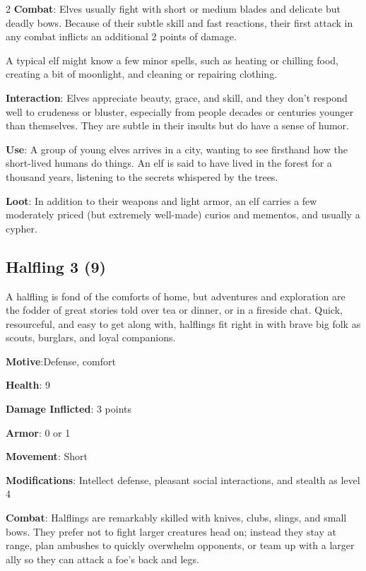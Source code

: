 \begin{multicols}{2}
\textbf{Combat}: Elves usually fight with short or medium blades and delicate but deadly bows. Because of their subtle skill and fast reactions, their first attack in any combat inflicts an additional 2 points of damage. 

A typical elf might know a few minor spells, such as heating or chilling food, creating a bit of moonlight, and cleaning or repairing clothing.

\textbf{Interaction}: Elves appreciate beauty, grace, and skill, and they don’t respond well to crudeness or bluster, especially from people decades or centuries younger than themselves. They are subtle in their insults but do have a sense of humor. 

\textbf{Use}: A group of young elves arrives in a city, wanting to see firsthand how the short-lived humans do things. An elf is said to have lived in the forest for a thousand years, listening to the secrets whispered by the trees.

\textbf{Loot}: In addition to their weapons and light armor, an elf carries a few moderately priced (but extremely well-made) curios and mementos, and usually a cypher.

\subsection{Halfling 3 (9)}

A halfling is fond of the comforts of home, but adventures and exploration are the fodder of great stories told over tea or dinner, or in a fireside chat. Quick, resourceful, and easy to get along with, halflings fit right in with brave big folk as scouts, burglars, and loyal companions. 

\textbf{Motive}:Defense, comfort 

\textbf{Health}: 9 

\textbf{Damage Inflicted}: 3 points 

\textbf{Armor}: 0 or 1 

\textbf{Movement}: Short 

\textbf{Modifications}: Intellect defense, pleasant social interactions, and stealth as level 4 

\textbf{Combat}: Halflings are remarkably skilled with knives, clubs, slings, and small bows. They prefer not to fight larger creatures head on; instead they stay at range, plan ambushes to quickly overwhelm opponents, or team up with a larger ally so they can attack a foe’s back and legs.


\end{multicols}
